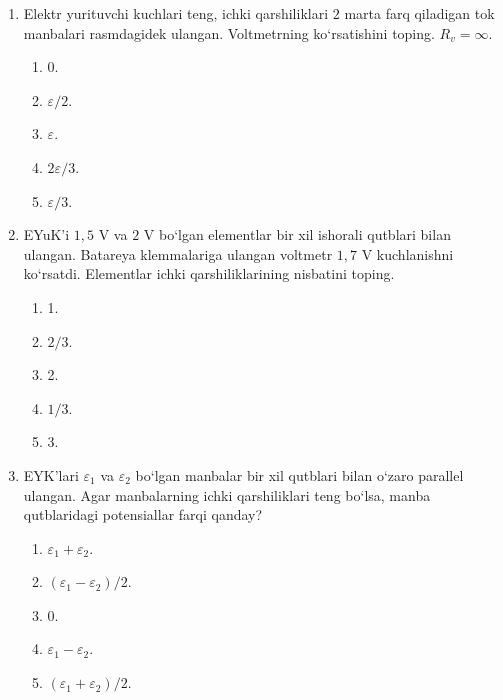 \begin{enumerate}
\item Elektr yurituvchi kuchlari teng, ichki qarshiliklari $2$ marta farq qiladigan tok manbalari rasmdagidek ulangan. Voltmetrning ko‘rsatishini toping. $R_v=\infty$.


\begin{enumerate}[label=\Alph*)]
\item 0.
\item $\varepsilon/2$.
\item $\varepsilon$.
\item $2\varepsilon/3$.
\item $\varepsilon/3$.
\end{enumerate}

\item EYuK’i $1,5$ V va $2$ V bo‘lgan elementlar bir xil ishorali qutblari bilan ulangan. Batareya klemmalariga ulangan voltmetr $1,7$ V kuchlanishni ko‘rsatdi. Elementlar ichki qarshiliklarining nisbatini toping.
\begin{enumerate}[label=\Alph*)]
\item 1.
\item $2/3$.
\item 2.
\item $1/3$.
\item 3.
\end{enumerate}

\item EYK’lari $\varepsilon_1$ va $\varepsilon_2$ bo‘lgan manbalar bir xil qutblari bilan o‘zaro parallel ulangan. Agar manbalarning ichki qarshiliklari teng bo‘lsa, manba qutblaridagi potensiallar farqi qanday?
\begin{enumerate}[label=\Alph*)]
\item $\varepsilon_1+\varepsilon_2$.
\item $(\varepsilon_1-\varepsilon_2)/2$.
\item 0.
\item $\varepsilon_1-\varepsilon_2$.
\item $(\varepsilon_1+\varepsilon_2)/2$.
\end{enumerate}


\end{enumerate}
